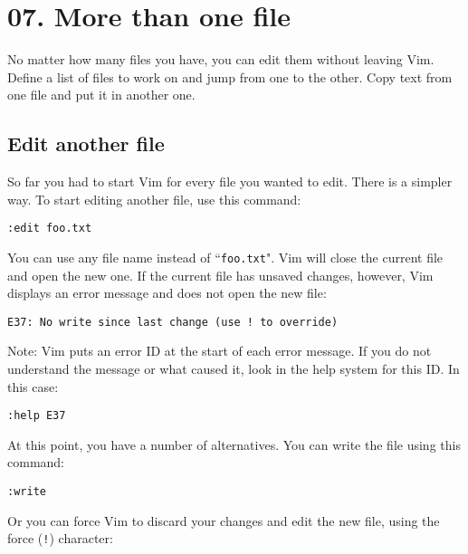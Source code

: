 \section{07. More than one file}
No matter how many files you have, you can edit them without leaving Vim.
Define a list of files to work on and jump from one to the other.
Copy text from one file and put it in another one.
\localtableofcontents
\subsection{Edit another file}

So far you had to start Vim for every file you wanted to edit.
There is a simpler way.
To start editing another file, use this command:

 \begin{Verbatim}[samepage=true]
 :edit foo.txt
 \end{Verbatim}

You can use any file name instead of ``\texttt{foo.txt}".
Vim will close the current file and open the new one.
If the current file has unsaved changes, however, Vim displays an error message and does not open the new file:

\begin{Verbatim}[samepage=true]
  E37: No write since last change (use ! to override) 
\end{Verbatim}

Note:
Vim puts an error ID at the start of each error message.
If you do not understand the message or what caused it, look in the help system for this ID.
In this case:

\begin{Verbatim}[samepage=true]
  :help E37
\end{Verbatim}

At this point, you have a number of alternatives.
You can write the file using this command:

 \begin{Verbatim}[samepage=true]
 :write
 \end{Verbatim}

 Or you can force Vim to discard your changes and edit the new file, using the force (\texttt{!}) character:

